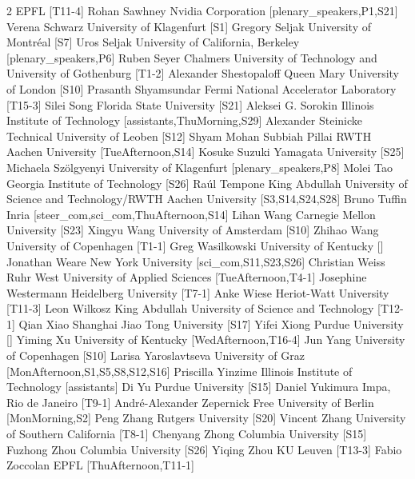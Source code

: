 \begin{multicols}{2}
  {EPFL}
  [T11-4]
\participantne
  {Rohan Sawhney}
  {Nvidia Corporation}
  [plenary_speakers,P1,S21]
\participantne
  {Verena Schwarz}
  {University of Klagenfurt}
  [S1]
\participantne
  {Gregory Seljak}
  {University of Montr\'eal}
  [S7]
\participantne
  {Uros Seljak}
  {University of California, Berkeley}
  [plenary_speakers,P6]
\participantne
  {Ruben Seyer}
  {Chalmers University of Technology and University of Gothenburg}
  [T1-2]
\participantne
  {Alexander Shestopaloff}
  {Queen Mary University of London}
  [S10]
\participantne
  {Prasanth Shyamsundar}
  {Fermi National Accelerator Laboratory}
  [T15-3]
\participantne
  {Silei Song}
  {Florida State University}
  [S21]
\participantne
  {Aleksei G. Sorokin}
  {Illinois Institute of Technology}
  [assistants,ThuMorning,S29]
\participantne
  {Alexander Steinicke}
  {Technical University of Leoben}
  [S12]
\participantne
  {Shyam Mohan Subbiah Pillai}
  {RWTH Aachen University}
  [TueAfternoon,S14]
\participantne
  {Kosuke Suzuki}
  {Yamagata University}
  [S25]
\participantne
  {Michaela Sz\"olgyenyi}
  {University of Klagenfurt}
  [plenary_speakers,P8]
\participantne
  {Molei Tao}
  {Georgia Institute of Technology}
  [S26]
\participantne
  {Ra\'ul Tempone}
  {King Abdullah University of Science and Technology/RWTH Aachen University}
  [S3,S14,S24,S28]
\participantne
  {Bruno Tuffin}
  {Inria}
  [steer_com,sci_com,ThuAfternoon,S14]
\participantne
  {Lihan Wang}
  {Carnegie Mellon University}
  [S23]
\participantne
  {Xingyu Wang}
  {University of Amsterdam}
  [S10]
\participantne
  {Zhihao Wang}
  {University of Copenhagen}
  [T1-1]
\participantne
  {Greg Wasilkowski}
  {University of Kentucky}
  []
\participantne
  {Jonathan Weare}
  {New York University}
  [sci_com,S11,S23,S26]
\participantne
  {Christian Weiss}
  {Ruhr West University of Applied Sciences}
  [TueAfternoon,T4-1]
\participantne
  {Josephine Westermann}
  {Heidelberg University}
  [T7-1]
\participantne
  {Anke Wiese}
  {Heriot-Watt University}
  [T11-3]
\participantne
  {Leon Wilkosz}
  {King Abdullah University of Science and Technology}
  [T12-1]
\participantne
  {Qian Xiao}
  {Shanghai Jiao Tong University}
  [S17]
\participantne
  {Yifei Xiong}
  {Purdue University}
  []
\participantne
  {Yiming Xu}
  {University of Kentucky}
  [WedAfternoon,T16-4]
\participantne
  {Jun Yang}
  {University of Copenhagen}
  [S10]
\participantne
  {Larisa Yaroslavtseva}
  {University of Graz}
  [MonAfternoon,S1,S5,S8,S12,S16]
\participantne
  {Priscilla Yinzime}
  {Illinois Institute of Technology}
  [assistants]
\participantne
  {Di Yu}
  {Purdue University}
  [S15]
\participantne
  {Daniel Yukimura}
  {Impa, Rio de Janeiro}
  [T9-1]
\participantne
  {Andr\'e-Alexander Zepernick}
  {Free University of Berlin}
  [MonMorning,S2]
\participantne
  {Peng Zhang}
  {Rutgers University}
  [S20]
\participantne
  {Vincent Zhang}
  {University of Southern California}
  [T8-1]
\participantne
  {Chenyang Zhong}
  {Columbia University}
  [S15]
\participantne
  {Fuzhong Zhou}
  {Columbia University}
  [S26]
\participantne
  {Yiqing Zhou}
  {KU Leuven}
  [T13-3]
\participantne
  {Fabio Zoccolan}
  {EPFL}
  [ThuAfternoon,T11-1]
\end{multicols}
